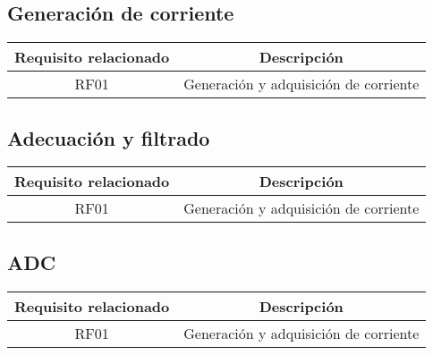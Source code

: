 \documentclass[../et.tex]{subfiles}
\begin{document}

\subsection{Generación de corriente}
\begin{table}[H]
  \centering
  \begin{tabular}{|c|c|}
    \hline
    \rowcolor[HTML]{C0C0C0}
    Requisito relacionado   & Descripción                           \\ \hline
    RF01                    & Generación y adquisición de corriente \\ \hline
  \end{tabular}
\end{table}




\subsection{Adecuación y filtrado}
\label{sec:analog-y-dig.adecuacion}
\begin{table}[H]
  \centering
  \begin{tabular}{|c|c|}
    \hline
    \rowcolor[HTML]{C0C0C0}
    Requisito relacionado   & Descripción                           \\ \hline
    RF01                    & Generación y adquisición de corriente \\ \hline
  \end{tabular}
\end{table}




\subsection{ADC}
\begin{table}[H]
  \centering
  \begin{tabular}{|c|c|}
    \hline
    \rowcolor[HTML]{C0C0C0}
    Requisito relacionado   & Descripción                           \\ \hline
    RF01                    & Generación y adquisición de corriente \\ \hline
  \end{tabular}
\end{table}
\end{document}
